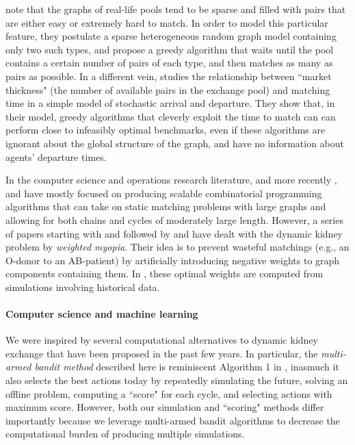 \cite{ashlagi2013kidney} note that the graphs of real-life pools tend to be sparse and filled with pairs that are either easy or extremely hard to match. In order to model this particular feature, they postulate a sparse heterogeneous random graph model containing only two such types, and propose a greedy algorithm that waits until the pool contains a certain number of pairs of each type, and then matches as many as pairs as possible. In a different vein, \cite{akbarpour2017thickness} studies the relationship between ``market thickness" (the number of available pairs in the exchange pool) and matching time in a simple model of stochastic arrival and departure. They show that, in their model, greedy algorithms that cleverly exploit the time to match can can perform close to infeasibly optimal benchmarks, even if these algorithms are ignorant about the global structure of the graph, and have no information about agents' departure times.

In the computer science and operations research literature, \cite{abraham2007clearing} and more recently \cite{anderson2015finding}, \cite{dickerson2016position} and \cite{dickerson2017small} have mostly focused on producing scalable combinatorial programming algorithms that can take on static matching problems with large graphs and allowing for both chains and cycles of moderately large length. However, a series of papers starting with \cite{awasthi2009online} and followed by \cite{dickerson2012dynamic} and \cite{dickerson2015futurematch} have dealt with the dynamic kidney problem by \emph{weighted myopia}. Their idea is to prevent wasteful matchings (e.g., an O-donor to an AB-patient) by artificially introducing negative weights to graph components containing them. In \cite{dickerson2015futurematch}, these optimal weights are computed from simulations involving historical data. 

\paragraph{Computer science and machine learning} We were inspired by several computational alternatives to dynamic kidney exchange that have been proposed in the past few years. In particular, the \emph{multi-armed bandit method} described here is reminiscent Algorithm 1 in \citet{awasthi2009online}, inasmuch it also selects the best actions today by repeatedly simulating the future, solving an offline problem, computing a ``score" for each cycle, and selecting actions with maximum score. However, both our simulation and ``scoring" methods differ importantly because we leverage multi-armed bandit algorithms to decrease the computational burden of producing multiple simulations. 

